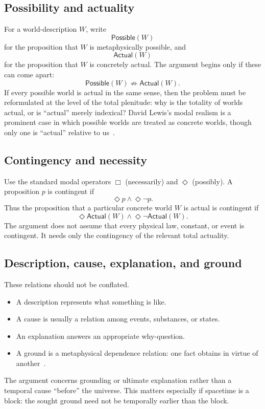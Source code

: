 \documentclass[11pt,letterpaper]{article}
\theoremstyle{plain}
\theoremstyle{definition}
\newcommand{\Actual}{\mathsf{Actual}}
\newcommand{\Possible}{\mathsf{Possible}}
\begin{document}
\subsection{Possibility and actuality}

For a world-description $W$, write
\[
  \Possible(W)
\]
for the proposition that $W$ is metaphysically possible, and
\[
  \Actual(W)
\]
for the proposition that $W$ is concretely actual. The argument begins only if these can come apart:
\[
  \Possible(W) \not\Rightarrow \Actual(W).
\]
If every possible world is actual in the same sense, then the problem must be reformulated at the level of the total plenitude: why is the totality of worlds actual, or is ``actual'' merely indexical? David Lewis's modal realism is a prominent case in which possible worlds are treated as concrete worlds, though only one is ``actual'' relative to us~\cite{lewis}.

\subsection{Contingency and necessity}

Use the standard modal operators $\Box$ (necessarily) and $\Diamond$ (possibly). A proposition $p$ is contingent if
\[
  \Diamond p \land \Diamond \neg p.
\]
Thus the proposition that a particular concrete world $W$ is actual is contingent if
\[
  \Diamond \Actual(W) \land \Diamond \neg \Actual(W).
\]
The argument does not assume that every physical law, constant, or event is contingent. It needs only the contingency of the relevant total actuality.

\subsection{Description, cause, explanation, and ground}

These relations should not be conflated.
\begin{itemize}
  \item A description represents what something is like.
  \item A cause is usually a relation among events, substances, or states.
  \item An explanation answers an appropriate why-question.
  \item A ground is a metaphysical dependence relation: one fact obtains in virtue of another~\cite{fine}.
\end{itemize}
The argument concerns grounding or ultimate explanation rather than a temporal cause ``before'' the universe. This matters especially if spacetime is a block: the sought ground need not be temporally earlier than the block.
\end{document}
